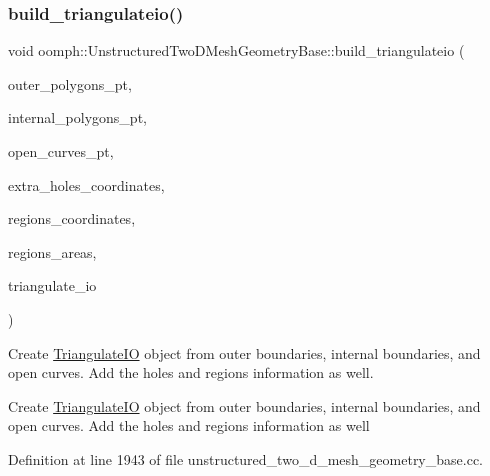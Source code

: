 \subsubsection{\texorpdfstring{build\+\_\+triangulateio()}{build\_triangulateio()}}
{\footnotesize\ttfamily void oomph\+::\+Unstructured\+Two\+D\+Mesh\+Geometry\+Base\+::build\+\_\+triangulateio (\begin{DoxyParamCaption}\item[{\hyperlink{classoomph_1_1Vector}{Vector}$<$ \hyperlink{classoomph_1_1TriangleMeshPolygon}{Triangle\+Mesh\+Polygon} $\ast$$>$ \&}]{outer\+\_\+polygons\+\_\+pt,  }\item[{\hyperlink{classoomph_1_1Vector}{Vector}$<$ \hyperlink{classoomph_1_1TriangleMeshPolygon}{Triangle\+Mesh\+Polygon} $\ast$$>$ \&}]{internal\+\_\+polygons\+\_\+pt,  }\item[{\hyperlink{classoomph_1_1Vector}{Vector}$<$ \hyperlink{classoomph_1_1TriangleMeshOpenCurve}{Triangle\+Mesh\+Open\+Curve} $\ast$$>$ \&}]{open\+\_\+curves\+\_\+pt,  }\item[{\hyperlink{classoomph_1_1Vector}{Vector}$<$ \hyperlink{classoomph_1_1Vector}{Vector}$<$ double $>$ $>$ \&}]{extra\+\_\+holes\+\_\+coordinates,  }\item[{std\+::map$<$ unsigned, \hyperlink{classoomph_1_1Vector}{Vector}$<$ double $>$ $>$ \&}]{regions\+\_\+coordinates,  }\item[{std\+::map$<$ unsigned, double $>$ \&}]{regions\+\_\+areas,  }\item[{\hyperlink{structoomph_1_1TriangulateIO}{Triangulate\+IO} \&}]{triangulate\+\_\+io }\end{DoxyParamCaption})\hspace{0.3cm}{\ttfamily [protected]}}



Create \hyperlink{structoomph_1_1TriangulateIO}{Triangulate\+IO} object from outer boundaries, internal boundaries, and open curves. Add the holes and regions information as well. 

Create \hyperlink{structoomph_1_1TriangulateIO}{Triangulate\+IO} object from outer boundaries, internal boundaries, and open curves. Add the holes and regions information as well 

Definition at line 1943 of file unstructured\+\_\+two\+\_\+d\+\_\+mesh\+\_\+geometry\+\_\+base.\+cc.



